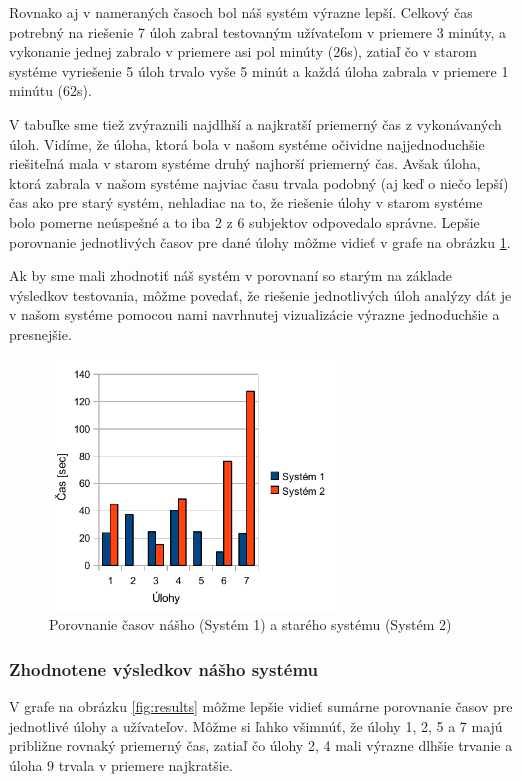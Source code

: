 Rovnako aj v nameraných časoch bol náš systém výrazne lepší. Celkový čas potrebný na riešenie 7 úloh zabral testovaným užívateľom v priemere 3 minúty, a vykonanie jednej zabralo v priemere asi pol minúty (26s), zatiaľ čo v starom systéme vyriešenie 5 úloh trvalo vyše 5 minút a každá úloha zabrala v priemere 1 minútu (62s).

V tabuľke sme tiež zvýraznili najdlhší a najkratší priemerný čas z vykonávaných úloh. Vidíme, že úloha, ktorá bola v našom systéme očividne najjednoduchšie riešiteľná mala v starom systéme druhý najhorší priemerný čas. Avšak úloha, ktorá zabrala v našom systéme najviac času trvala podobný (aj keď o niečo lepší) čas ako pre starý systém, nehladiac na to, že riešenie úlohy v starom systéme bolo pomerne neúspešné a to iba 2 z 6 subjektov odpovedalo správne. Lepšie porovnanie jednotlivých časov pre dané úlohy môžme vidieť v grafe na obrázku \ref{fig:times}.

Ak by sme mali zhodnotiť náš systém v porovnaní so starým na základe výsledkov testovania, môžme povedať, že riešenie jednotlivých úloh analýzy dát je v našom systéme pomocou nami navrhnutej vizualizácie výrazne jednoduchšie a presnejšie.

\begin{figure}
	\centering
	\includegraphics[width = 3in]{times}
	\caption{Porovnanie časov nášho (Systém 1) a starého systému (Systém 2)}
	\label{fig:times} 
\end{figure}

\subsubsection{Zhodnotene výsledkov nášho systému}
V grafe na obrázku \ref{fig:results} môžme lepšie vidieť sumárne porovnanie časov pre jednotlivé úlohy a užívateľov. Môžme si ľahko všimnúť, že úlohy 1, 2, 5 a 7 majú približne rovnaký priemerný čas, zatiaľ čo úlohy 2, 4 mali výrazne dlhšie trvanie a úloha 9 trvala v priemere najkratšie.

